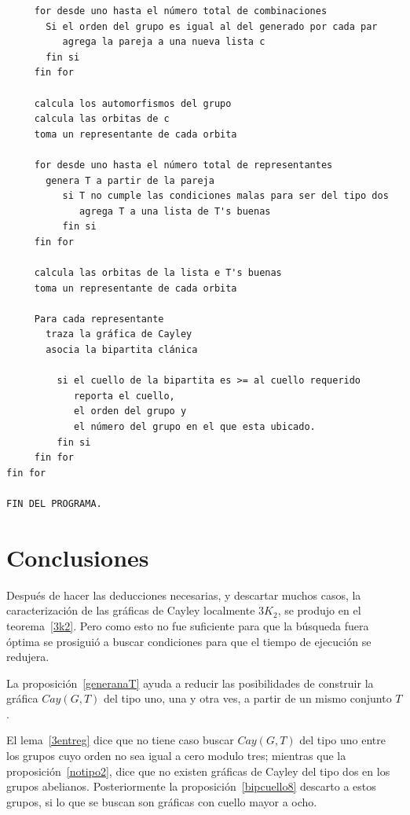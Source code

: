 \documentclass[12pt]{book}
\theoremstyle{definition}
\begin{document}
\begin{small}
\begin{verbatim}
     for desde uno hasta el número total de combinaciones
       Si el orden del grupo es igual al del generado por cada par     
          agrega la pareja a una nueva lista c
       fin si
     fin for    

     calcula los automorfismos del grupo
     calcula las orbitas de c 
     toma un representante de cada orbita

     for desde uno hasta el número total de representantes
       genera T a partir de la pareja
          si T no cumple las condiciones malas para ser del tipo dos
             agrega T a una lista de T's buenas
          fin si 
     fin for 

     calcula las orbitas de la lista e T's buenas
     toma un representante de cada orbita  
  
     Para cada representante 
       traza la gráfica de Cayley
       asocia la bipartita clánica
                      
         si el cuello de la bipartita es >= al cuello requerido
            reporta el cuello,
            el orden del grupo y 
            el número del grupo en el que esta ubicado.       
         fin si 
     fin for
fin for

FIN DEL PROGRAMA.

\end{verbatim}
\end{small}

\chapter{Conclusiones}


Después de hacer las deducciones necesarias, y descartar muchos casos,
la caracterización de las gráficas de Cayley localmente $3K_2$, se
produjo en el teorema~\ref{3k2}. Pero como esto no fue suficiente para
que la búsqueda fuera óptima se prosiguió a buscar condiciones para
que el tiempo de ejecución se redujera.


La proposición~\ref{generanaT} ayuda a reducir las posibilidades de
construir la gráfica $Cay(G,T)$ del tipo uno, una y otra ves, a partir
de un mismo conjunto $T$.


El lema~\ref{3entreg} dice que no tiene caso buscar $Cay(G,T)$ del
tipo uno entre los grupos cuyo orden no sea igual a cero modulo tres;
mientras que la proposición~\ref{notipo2}, dice que no existen
gráficas de Cayley del tipo dos en los grupos
abelianos. Posteriormente la proposición~\ref{bipcuello8} descarto a
estos grupos, si lo que se buscan son gráficas con cuello mayor a
ocho.
\end{document}

